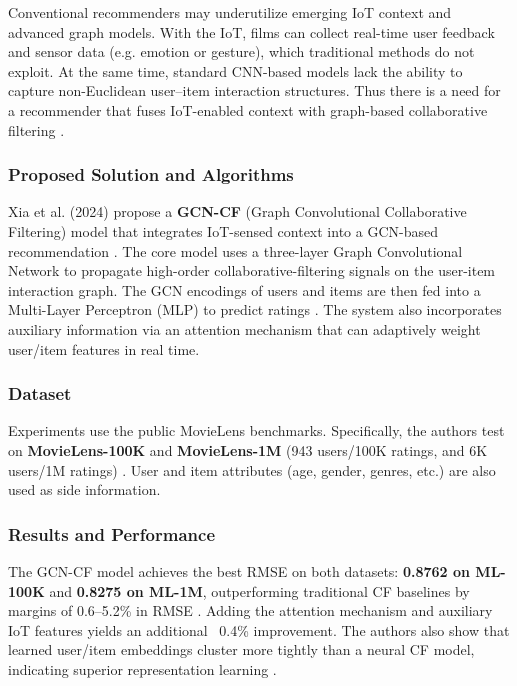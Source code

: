 Conventional recommenders may underutilize emerging IoT context and advanced graph models. With the IoT, films can collect real-time user feedback and sensor data (e.g. emotion or gesture), which traditional methods do not exploit. At the same time, standard CNN-based models lack the ability to capture non-Euclidean user–item interaction structures. Thus there is a need for a recommender that fuses IoT-enabled context with graph-based collaborative filtering \cite{xia2024iot}.



\subsubsection{Proposed Solution and Algorithms}

Xia et al. (2024) propose a \textbf{GCN-CF} (Graph Convolutional Collaborative Filtering) model that integrates IoT-sensed context into a GCN-based recommendation \cite{xia2024iot}. The core model uses a three-layer Graph Convolutional Network to propagate high-order collaborative-filtering signals on the user-item interaction graph. The GCN encodings of users and items are then fed into a Multi-Layer Perceptron (MLP) to predict ratings \cite{xia2024iot}. The system also incorporates auxiliary information via an attention mechanism that can adaptively weight user/item features in real time.



\subsubsection{Dataset}

Experiments use the public MovieLens benchmarks. Specifically, the authors test on \textbf{MovieLens-100K} and \textbf{MovieLens-1M} (943 users/100K ratings, and 6K users/1M ratings) \cite{xia2024iot}. User and item attributes (age, gender, genres, etc.) are also used as side information.



\subsubsection{Results and Performance}

The GCN-CF model achieves the best RMSE on both datasets: \textbf{0.8762 on ML-100K} and \textbf{0.8275 on ML-1M}, outperforming traditional CF baselines by margins of 0.6–5.2\% in RMSE \cite{xia2024iot}. Adding the attention mechanism and auxiliary IoT features yields an additional ~0.4\% improvement. The authors also show that learned user/item embeddings cluster more tightly than a neural CF model, indicating superior representation learning \cite{xia2024iot}.



